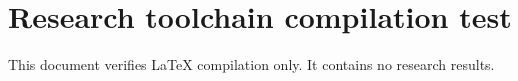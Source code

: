 \documentclass{article}
\begin{document}
\section*{Research toolchain compilation test}
This document verifies LaTeX compilation only. It contains no research results.
\end{document}
